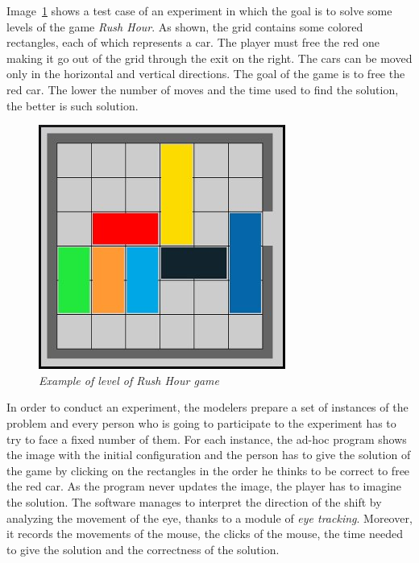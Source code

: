  
	Image~\ref{fig:RushHourHuman} shows a test case of an experiment in which the goal is to solve some levels of the game \emph{Rush Hour}. As shown, the grid contains some colored rectangles, each of which represents a car. The player must free the red one making it go out of the grid through the exit on the right. The cars can be moved only in the horizontal and vertical directions. The goal of the game is to free the red car. The lower the number of moves and the time used to find the solution, the better is such solution.

	\begin{figure}[!h]
	  \begin{center} 
	    \includegraphics[scale=0.6]{images/ch_03/originale.jpg}	
	  \end{center} 
	  \caption{\textit{Example of level of Rush Hour game}}
	  \label{fig:RushHourHuman}	
  	\end{figure}
	
	In order to conduct an experiment, the modelers prepare a set of instances of the problem and every person who is going to participate to the experiment has to try to face a fixed number of them.
	For each instance, the ad-hoc program shows the image with the initial configuration and the person has to give the solution of the game by clicking on the rectangles in the order he thinks to be correct to free the red car. As the program never updates the image, the player has to imagine the solution. The software manages to interpret the direction of the shift by analyzing the movement of the eye, thanks to a module of \emph{eye tracking}. Moreover, it records the movements of the mouse, the clicks of the mouse, the time needed to give the solution and the correctness of the solution. 


